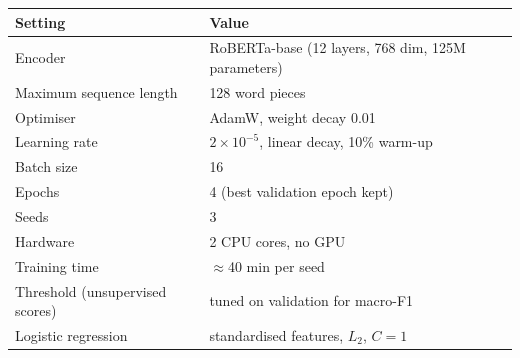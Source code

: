 \begin{tabular}{@{}ll@{}}
\toprule
Setting & Value \\
\midrule
Encoder & RoBERTa-base (12 layers, 768 dim, 125M parameters) \\
Maximum sequence length & 128 word pieces \\
Optimiser & AdamW, weight decay 0.01 \\
Learning rate & $2\times10^{-5}$, linear decay, 10\% warm-up \\
Batch size & 16 \\
Epochs & 4 (best validation epoch kept) \\
Seeds & 3 \\
Hardware & 2 CPU cores, no GPU \\
Training time & $\approx$40 min per seed \\
Threshold (unsupervised scores) & tuned on validation for macro-F1 \\
Logistic regression & standardised features, $L_2$, $C=1$ \\
\bottomrule
\end{tabular}
